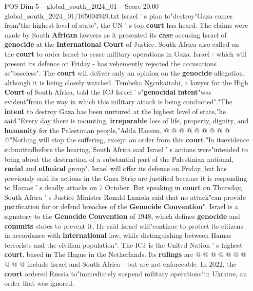 \begin{textsample}{POS Dim 5 – global\_south\_2024\_01 – Score 20.00 – global\_south\_2024\_01/105004949.txt}  \label{ex:f5_pos_007}
Israel ' s plan to"destroy"Gaza comes from"the highest level of state", the UN ' s top \textbf{court} has heard.
The claims were made by South \textbf{African} lawyers as it presented its \textbf{case} accusing Israel of \textbf{genocide} at the \textbf{International} \textbf{Court} of Justice.
South Africa also called on the \textbf{court} to order Israel to cease military operations in Gaza.
Israel - which will present its defence on Friday - has vehemently rejected the accusations as"baseless".
The \textbf{court} will deliver only an opinion on the \textbf{genocide} allegation, although it is being closely watched.
Tembeka Ngcukaitobi, a lawyer for the High \textbf{Court} of South Africa, told the ICJ Israel ' s"\textbf{genocidal} \textbf{intent}"was evident"from the way in which this military attack is being conducted"."The \textbf{intent} to destroy Gaza has been nurtured at the highest level of state,"he said."Every day there is mounting, \textbf{irreparable} loss of life, property, dignity, and \textbf{humanity} for the Palestinian people,"Adila Hassim, @ @ @ @ @ @ @ @ @ @"Nothing will stop the suffering, except an order from this \textbf{court}."In itsevidence submittedbefore the hearing, South Africa said Israel ' s actions were"intended to bring about the destruction of a substantial part of the Palestinian national, \textbf{racial} and \textbf{ethnical} group".
Israel will offer its defence on Friday, but has previously said its actions in the Gaza Strip are justified because it is responding to Hamas ' s deadly attacks on 7 October.
But speaking in \textbf{court} on Thursday, South Africa ' s Justice Minister Ronald Lamola said that no attack"can provide justification for or defend breaches of the \textbf{Genocide} \textbf{Convention}".
Israel is a signatory to the \textbf{Genocide} \textbf{Convention} of 1948, which defines \textbf{genocide} and \textbf{commits} states to prevent it.
He said Israel will"continue to protect its citizens in accordance with \textbf{international} law, while distinguishing between Hamas terrorists and the civilian population".
The ICJ is the United Nation ' s highest \textbf{court}, based in The Hague in the Netherlands.
Its \textbf{rulings} are @ @ @ @ @ @ @ @ @ @ include Israel and South Africa - but are not enforceable.
In 2022, the \textbf{court} ordered Russia to"immediately suspend military operations"in Ukraine, an order that was ignored.

\end{textsample}
